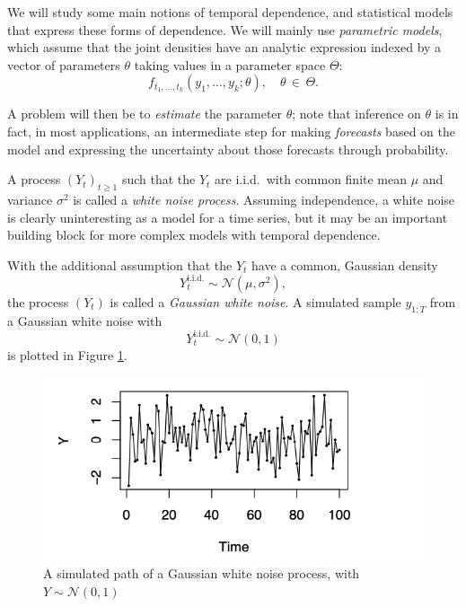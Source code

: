 \documentclass[dvipsnames,12pt]{book}
\begin{document}
                We will study some main notions of temporal dependence, and statistical models that express these forms of dependence. We will mainly use \emph{parametric models}, which assume that the joint densities have an analytic expression indexed by a vector of parameters $\theta$ taking values in a parameter space $\Theta$:
                \[
                  f_{t_1,\ldots,t_k}(y_1,\ldots,y_k;\theta),
                  \quad
                  \theta \,\in\, \Theta.
                \]
                
                A problem will then be to \emph{estimate} the parameter $\theta$; note that inference on $\theta$ is in fact, in most applications, an intermediate step for making \emph{forecasts} based on the model and expressing the uncertainty about those forecasts through probability.

\newpage


                \begin{example}
                    A process $(Y_t)_{t\ge 1}$ such that the $Y_t$ are i.i.d.\ with common finite mean $\mu$ and variance $\sigma^2$ is called a  \emph{white noise process}. Assuming independence, a white noise is  clearly uninteresting as a model for a time series, but it may be an  important building block for more complex models with temporal dependence.

                    With the additional assumption that the $Y_t$ have a common, Gaussian density
                    \[
                      Y_t^{\mathrm{i.i.d.}} \sim \mathcal{N}(\mu,\sigma^2),
                    \]
                    the process $(Y_t)$ is called a \emph{Gaussian white noise}. A simulated sample 
                    $y_{1:T}$ from a Gaussian white noise with 
                    \[
                      Y_t^{\mathrm{i.i.d.}} \sim \mathcal{N}(0,1)
                    \]
                    is plotted in Figure \ref{fig:L3-2}.
                \end{example}

                \begin{figure}[h]
                    \centering
                    \includegraphics[width=0.75\linewidth]{images/L3-2.png}
                    \caption{A simulated path of a Gaussian white noise process, with \(Y \sim \mathcal{N}(0,1) \)}
                    \label{fig:L3-2}
                \end{figure}
\end{document}
